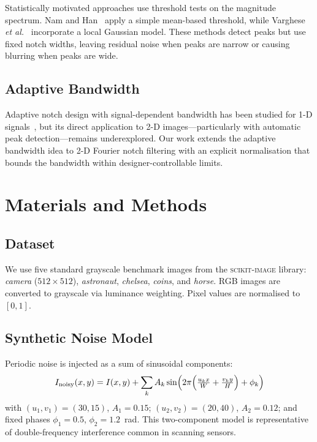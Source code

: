 \documentclass[conference,a4paper]{IEEEtran}
\begin{document}
Statistically motivated approaches use threshold tests on the magnitude spectrum. Nam and Han~\cite{nam2007} apply a simple mean-based threshold, while Varghese \emph{et al.}~\cite{varghese2014} incorporate a local Gaussian model. These methods detect peaks but use fixed notch widths, leaving residual noise when peaks are narrow or causing blurring when peaks are wide.

\subsection{Adaptive Bandwidth}

Adaptive notch design with signal-dependent bandwidth has been studied for 1-D signals~\cite{regalia1991}, but its direct application to 2-D images—particularly with automatic peak detection—remains underexplored. Our work extends the adaptive bandwidth idea to 2-D Fourier notch filtering with an explicit normalisation that bounds the bandwidth within designer-controllable limits.

\section{Materials and Methods}
\label{sec:methods}

\subsection{Dataset}

We use five standard grayscale benchmark images from the \textsc{scikit-image} library: \textit{camera} ($512\times512$), \textit{astronaut}, \textit{chelsea}, \textit{coins}, and \textit{horse}. RGB images are converted to grayscale via luminance weighting. Pixel values are normalised to $[0,1]$.

\subsection{Synthetic Noise Model}

Periodic noise is injected as a sum of sinusoidal components:
\begin{equation}
  I_\text{noisy}(x,y) = I(x,y) + \sum_{k} A_k \sin\!\left(2\pi\Bigl(\tfrac{u_k x}{W} + \tfrac{v_k y}{H}\Bigr) + \phi_k\right)
  \label{eq:noise}
\end{equation}
with $(u_1,v_1)=(30,15)$, $A_1=0.15$; $(u_2,v_2)=(20,40)$, $A_2=0.12$; and fixed phases $\phi_1=0.5$, $\phi_2=1.2$~rad. This two-component model is representative of double-frequency interference common in scanning sensors.
\end{document}

